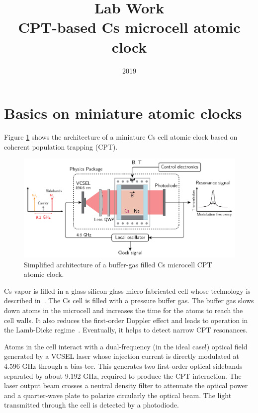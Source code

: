 \documentclass[a4paper,11pt]{article}
\title{Lab Work \\ CPT-based Cs microcell atomic clock}
\author{}
\date{2019}
\begin{document}
\maketitle

\tableofcontents 

\section{Basics on miniature atomic clocks}
Figure \ref{fig:globalcpt} shows the architecture of a miniature Cs cell atomic clock based on coherent population trapping (CPT).

\begin{figure}[h!]
	\centering
	\includegraphics[width=0.7\linewidth]{globalCPT}
	\caption{Simplified architecture of a buffer-gas filled Cs microcell CPT atomic clock.}
	\label{fig:globalcpt}
\end{figure}

Cs vapor is filled in a glass-silicon-glass micro-fabricated cell whose technology is described in~\cite{hasegawa}. The Cs cell is filled with a pressure buffer gas. The buffer gas slows down atoms in the microcell and increases the time for the atoms to reach the cell walls. It also reduces the first-order Doppler effect and leads to operation in the Lamb-Dicke regime~\cite{dicke}. Eventually, it helps to detect narrow CPT resonances.

Atoms in the cell interact with a dual-frequency (in the ideal case!) optical field generated by a VCSEL laser whose injection current is directly modulated at 4.596 GHz through a bias-tee. This generates two first-order optical sidebands separated by about 9.192 GHz, required to produce the CPT interaction. The laser output beam crosses a neutral density filter to attenuate the optical power and a quarter-wave plate to polarize circularly the optical beam. The light transmitted through the cell is detected by a photodiode.
\end{document}
